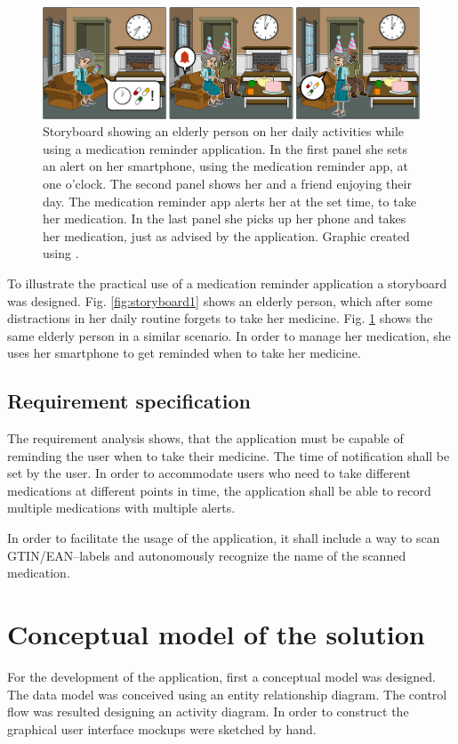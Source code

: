 \documentclass[conference]{IEEEtran}
\begin{document}
\begin{figure}
	\includegraphics[width=\textwidth]{images/storyboard02.png}
	\caption
	{Storyboard showing an elderly person on her daily activities while using a medication reminder application.
		In the first panel she sets an alert on her smartphone, using the medication reminder app, at one o'clock.
		The second panel shows her and a friend enjoying their day. The medication reminder app alerts her at the
		set time, to take her medication.
		In the last panel she picks up her phone and takes her medication, just as advised by the application.
		Graphic created using \cite{storyboard}.}
	\label{fig:storyboard2}
\end{figure}

To illustrate the practical use of a medication reminder application a storyboard was designed.
Fig. \ref{fig:storyboard1} shows an elderly person, which after some distractions in her daily
routine forgets to take her medicine.
Fig. \ref{fig:storyboard2} shows the same elderly person in a similar scenario. In order to manage
her medication, she uses her smartphone to get reminded when to take her medicine.

\subsection{Requirement specification} \label{sec:requirement_specification}
The requirement analysis shows, that the application must be capable of reminding the user when to take
their medicine. The time of notification shall be set by the user. In order to accommodate users who need
to take different medications at different points in time, the application shall be able to record multiple
medications with multiple alerts.

In order to facilitate the usage of the application, it shall include a way to scan GTIN/EAN--labels and
autonomously recognize the name of the scanned medication.

\section{Conceptual model of the solution}
For the development of the application, first a conceptual model was designed. The data model was conceived
using an entity relationship diagram. The control flow was resulted designing an activity diagram. In order
to construct the graphical user interface mockups were sketched by hand.
\end{document}
